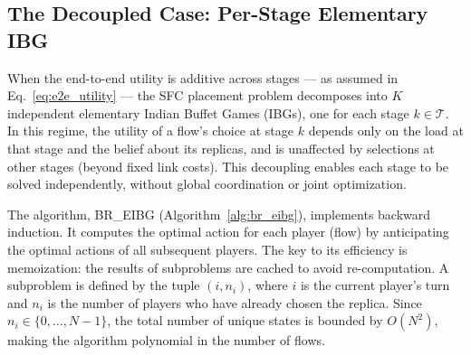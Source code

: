 \documentclass[journal]{IEEEtran}
\theoremstyle{plain}
\theoremstyle{definition}
\theoremstyle{remark}
\begin{document}
\subsection{The Decoupled Case: Per-Stage Elementary IBG}
\label{sec:exact_decoupled}

When the end-to-end utility is additive across stages — as assumed in Eq.~\eqref{eq:e2e_utility} — the SFC placement problem decomposes into $K$ independent elementary Indian Buffet Games (IBGs), one for each stage $k \in \mathcal{T}$. In this regime, the utility of a flow’s choice at stage $k$ depends only on the load at that stage and the belief about its replicas, and is unaffected by selections at other stages (beyond fixed link costs). This decoupling enables each stage to be solved independently, without global coordination or joint optimization.

The algorithm, \textsf{BR\_EIBG} (Algorithm~\ref{alg:br_eibg}), implements backward induction. It computes the optimal action for each player (flow) by anticipating the optimal actions of all subsequent players. The key to its efficiency is memoization: the results of subproblems are cached to avoid re-computation. A subproblem is defined by the tuple $(i, n_i)$, where $i$ is the current player's turn and $n_i$ is the number of players who have already chosen the replica. Since $n_i \in \{0, \dots, N-1\}$, the total number of unique states is bounded by $O(N^2)$, making the algorithm polynomial in the number of flows.

\begin{algorithm}[!t]
\caption{\textsf{BR\_EIBG}$(p_{k,\cdot}, n_i, i)$ — Backward induction for the elementary IBG}
\label{alg:br_eibg}
\DontPrintSemicolon
{}
\BlankLine
{}
\BlankLine
{}
\end{algorithm}
\end{document}
